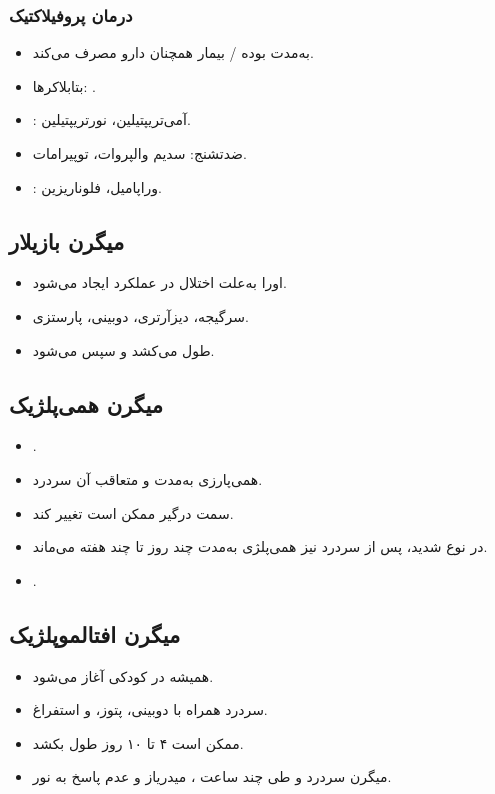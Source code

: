 \subsubsection{درمان پروفیلاکتیک}
\begin{itemize}
\item به‌مدت  بوده / بیمار همچنان دارو مصرف می‌کند.
\item بتابلاکرها: .
\item {}: آمی‌تریپتیلین، نورتریپتیلین.
\item ضدتشنج: سدیم والپروات، توپیرامات.
\item {}: وراپامیل، فلوناریزین.
\end{itemize}
\subsection{میگرن بازیلار}
\begin{itemize}
\item اورا به‌علت اختلال در عملکرد  ایجاد می‌شود.
\item سرگیجه، دیزآرتری، دوبینی، پارستزی.
\item {} طول می‌کشد و سپس  می‌شود.
\end{itemize}
\subsection{میگرن همی‌پلژیک}
\begin{itemize}
\item {}.
\item همی‌پارزی به‌مدت  و متعاقب آن سردرد.
\item سمت درگیر ممکن است تغییر کند.
\item در نوع شدید، پس از سردرد نیز همی‌پلژی به‌مدت چند روز تا چند هفته می‌ماند.
\item {}.
\end{itemize}
\subsection{میگرن افتالموپلژیک}
\begin{itemize}
\item همیشه در کودکی آغاز می‌شود.
\item سردرد همراه با دوبینی، پتوز، و استفراغ.
\item ممکن است ۴ تا ۱۰ روز طول بکشد.
\item میگرن سردرد  و طی چند ساعت ، میدریاز و عدم پاسخ به نور.
\end{itemize}

